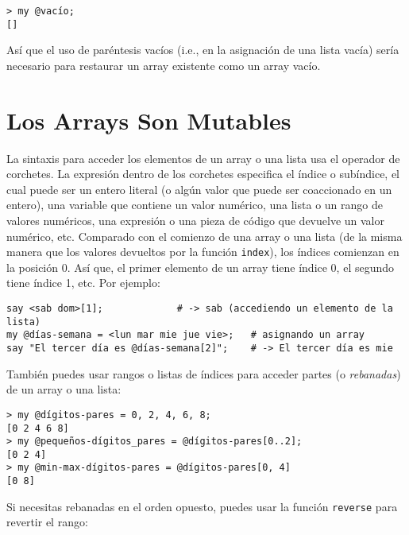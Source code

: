 \begin{lstlisting}
> my @vacío;
[]
\end{lstlisting}

Así que el uso de paréntesis vacíos (i.e., en la asignación
de una lista vacía) sería necesario para restaurar un
array existente como un array vacío.

\section{Los Arrays Son Mutables}
\label{mutable}

La sintaxis para acceder los elementos de un array o una lista
usa el operador de corchetes. La expresión dentro de los corchetes
especifica el índice o subíndice, el cual puede ser un 
entero literal (o algún valor que puede ser coaccionado en un 
entero), una variable que contiene un valor numérico,
una lista o un rango de valores numéricos, una expresión o una pieza
de código que devuelve un valor numérico, etc. Comparado con el
comienzo de una array o una lista (de la misma 
manera que los valores devueltos por la función {\tt index}),
los índices comienzan en la posición 0. Así que, el primer elemento
de un array tiene índice 0, el segundo tiene índice 1, etc. Por ejemplo:


\begin{lstlisting}
say <sab dom>[1];             # -> sab (accediendo un elemento de la lista)
my @días-semana = <lun mar mie jue vie>;   # asignando un array
say "El tercer día es @días-semana[2]";    # -> El tercer día es mie
\end{lstlisting}
%

También puedes usar rangos o listas de índices para acceder
partes (o \emph{rebanadas}) de un array o una lista:

\begin{lstlisting}
> my @dígitos-pares = 0, 2, 4, 6, 8;
[0 2 4 6 8]
> my @pequeños-dígitos_pares = @dígitos-pares[0..2];
[0 2 4]
> my @min-max-dígitos-pares = @dígitos-pares[0, 4]
[0 8]
\end{lstlisting}

Si necesitas rebanadas en el orden opuesto, puedes usar
la función {\tt reverse} para revertir el rango:


